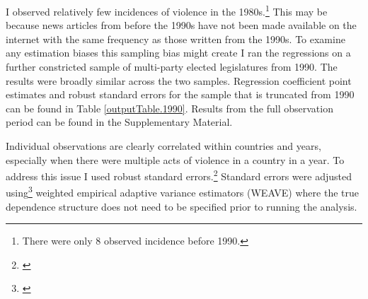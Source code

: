 \documentclass[a4paper]{article}\usepackage[]{graphicx}\usepackage[]{color}
\begin{document}
I observed relatively few incidences of violence in the 1980s.\footnote{There were only 8 observed incidence before 1990.} This may be because news articles from before the 1990s have not been made available on the internet with the same frequency as those written from the 1990s. To examine any estimation biases this sampling bias might create I ran the regressions on a further constricted sample of multi-party elected legislatures from 1990. The results were broadly similar across the two samples. Regression coefficient point estimates and robust standard errors for the sample that is truncated from 1990 can be found in Table \ref{outputTable.1990}. Results from the full observation period can be found in the Supplementary Material.

Individual observations are clearly correlated within countries and years, especially when there were multiple acts of violence in a country in a year. To address this issue I used robust standard errors.\footnote{\citealt{Golder2006, Mainwaring2007}} Standard errors were adjusted using\footnote{\citealt{Lumley1999}} weighted empirical adaptive variance estimators (WEAVE) where the true dependence structure does not need to be specified prior to running the analysis.
\end{document}
